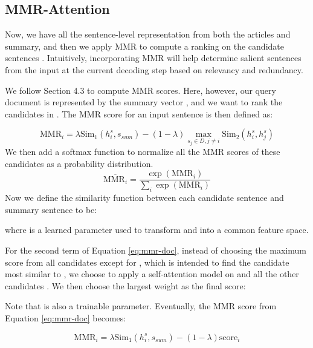 \documentclass[11pt,a4paper]{article}
\begin{document}
\subsection{MMR-Attention}

Now, we have all the sentence-level representation from both the articles and summary, and then we apply MMR to compute a ranking on the candidate sentences . Intuitively, incorporating MMR will help determine salient sentences from the input at the current decoding step based on relevancy and redundancy. 

We follow Section 4.3 to compute MMR scores. Here, however, our query document is represented by the summary vector , and we want to rank the candidates in . The MMR score for an input sentence  is then defined as:



\begin{dmath} 
\label{eq:mmr-doc}
{ {\text{MMR}} _{i} } =  \lambda { \text{Sim} }_{ 1 } (h^{s}_ {i },s_{sum})-(1-\lambda )\max _{ {s_j} \in D, j \neq i }{ \text{Sim}_2 }(h^{s}_ {i },h^{s}_ {j } ) 
\end{dmath}
We then add a softmax function to normalize all the MMR scores of these candidates as a probability distribution.
\begin{dmath} 
\label{eq:mmr-doc-softmax}
\overline{{\text{MMR}}_{ i}}  = \frac{\exp({ {\text{MMR}} _{i} })}{\sum_{i}{\exp({ {\text{MMR}} _{ i} })}}
\end{dmath}
Now we define the similarity function between each candidate sentence  and summary sentence  to be:

where  is a learned parameter used to transform  and  into a common feature space. 



For the second term of Equation \ref{eq:mmr-doc}, instead of choosing the maximum score from all candidates except for , which is intended to find the candidate most similar to , we choose to apply a self-attention model on  and all the other candidates . We then choose the largest weight as the final score:

\vspace{-4mm}

Note that  is also a trainable parameter. Eventually, the MMR score from Equation \ref{eq:mmr-doc} becomes:

\vspace{+2mm}
\begin{dmath} 
\label{eq:mmr-doc1}
{ {\text{MMR}} _{ i} } = \lambda { \text{Sim} }_{ 1 } (h^s_{i},s_{sum})-(1-\lambda ) \text{score}_{i}
\end{dmath}
\end{document}
